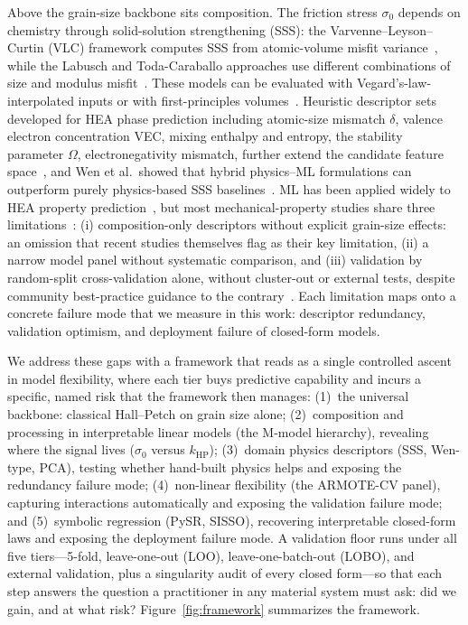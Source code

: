 \documentclass[5p,times,twocolumn]{elsarticle}
\begin{document}
Above the grain-size backbone sits composition. The friction stress $\sigma_0$ depends on chemistry through solid-solution strengthening (SSS): the Varvenne--Leyson--Curtin (VLC) framework computes SSS from atomic-volume misfit variance~\cite{Varvenne2016,Varvenne2017}, while the Labusch and Toda-Caraballo approaches use different combinations of size and modulus misfit~\cite{Labusch1970,TodaCaraballo2015}. These models can be evaluated with Vegard's-law-interpolated inputs or with first-principles volumes~\cite{Yin2020,Moitzi2022}. Heuristic descriptor sets developed for HEA phase prediction including atomic-size mismatch $\delta$, valence electron concentration VEC, mixing enthalpy and entropy, the stability parameter $\Omega$, electronegativity mismatch, further extend the candidate feature space~\cite{Zhang2008,Yang2012,Guo2011,Troparevsky2015,Ye2015geometric,Ye2015phi}, and Wen et al.\ showed that hybrid physics--ML formulations can outperform purely physics-based SSS baselines~\cite{Wen2021SSS}. ML has been applied widely to HEA property prediction~\cite{Huang2019,Islam2022,Wen2019,Rickman2019,Khatamsaz2023,LiuPei2023}, but most mechanical-property studies share three limitations~\cite{Hart2021}: (i) composition-only descriptors without explicit grain-size effects: an omission that recent studies themselves flag as their key limitation, (ii) a narrow model panel without systematic comparison, and (iii) validation by random-split cross-validation alone, without cluster-out or external tests, despite community best-practice guidance to the contrary~\cite{WangAYT2020}. Each limitation maps onto a concrete failure mode that we measure in this work: descriptor redundancy, validation optimism, and deployment failure of closed-form models.

We address these gaps with a framework that reads as a single controlled ascent in model flexibility, where each tier buys predictive capability and incurs a specific, named risk that the framework then manages:
(1)~the universal backbone: classical Hall--Petch on grain size alone;
(2)~composition and processing in interpretable linear models (the M-model hierarchy), revealing where the signal lives ($\sigma_0$ versus $k_\text{HP}$);
(3)~domain physics descriptors (SSS, Wen-type, PCA), testing whether hand-built physics helps and exposing the redundancy failure mode;
(4)~non-linear flexibility (the ARMOTE-CV panel), capturing interactions automatically and exposing the validation failure mode; and
(5)~symbolic regression (PySR, SISSO), recovering interpretable closed-form laws and exposing the deployment failure mode.
A validation floor runs under all five tiers---5-fold, leave-one-out (LOO), leave-one-batch-out (LOBO), and external validation, plus a singularity audit of every closed form---so that each step answers the question a practitioner in any material system must ask: did we gain, and at what risk? Figure~\ref{fig:framework} summarizes the framework.
\end{document}
